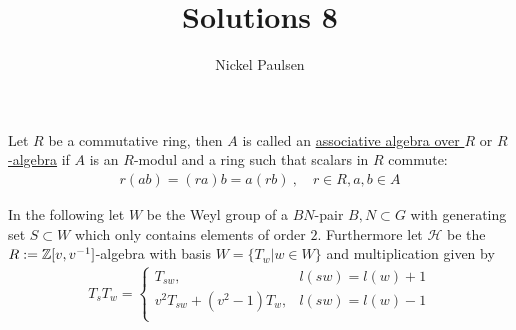 \documentclass[]{article}
\title{Solutions 8}
\author{Nickel Paulsen}
\begin{document}
\maketitle



\begin{definition*}
   Let \(R\) be a commutative ring, then \(A\) is called an \underline{associative algebra over \(R\)} or \underline{\(R\)-algebra} if \(A\) is an \(R\)-modul and a ring 
   such that scalars in \(R\) commute:
   \begin{align*}
     r ( a b) = (r a) b = a(rb) \ , \quad r \in R, a,b \in A
   \end{align*}
\end{definition*}

In the following let \(W\) be the Weyl group of a \(BN\)-pair \(B,N \subset G\) with generating set \(S \subset W\) which only contains elements
of order \(2\). Furthermore let \(\mathscr{H}\) be the \(R:={\mathbb{Z}}[v,v^{-1}]\)-algebra with basis \(W=\{T_w | w \in W\}\) and multiplication given by
\begin{align*}
    T_s T_w = \begin{cases}
        T_{sw}, & l(sw)=l(w)+1 \\
        v^2 T_{sw} + (v^2-1) T_w, & l(sw)= l(w)-1 \\
    \end{cases}
\end{align*}
\end{document}
